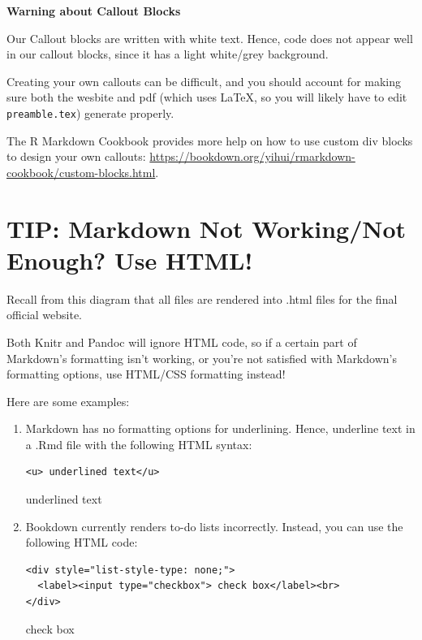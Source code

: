 \documentclass[
]{book}
\newenvironment{redbox}{
  \definecolor{shadecolor}{RGB}{243, 154, 157}
  \color{white}
  \begin{shaded}}
 {\end{shaded}}
\theoremstyle{definition}
\theoremstyle{definition}
\theoremstyle{definition}
\theoremstyle{definition}
\theoremstyle{remark}
\begin{document}
\begin{redbox}

\begin{center}
\textbf{Warning about Callout Blocks}

\end{center}

Our Callout blocks are written with white text. Hence, code does not appear well in our callout blocks, since it has a light white/grey background.

\end{redbox}

Creating your own callouts can be difficult, and you should account for making sure both the wesbite and pdf (which uses LaTeX, so you will likely have to edit \texttt{preamble.tex}) generate properly.

The R Markdown Cookbook provides more help on how to use custom div blocks to design your own callouts: \url{https://bookdown.org/yihui/rmarkdown-cookbook/custom-blocks.html}.

\section{TIP: Markdown Not Working/Not Enough? Use HTML!}\label{use-html}

Recall from this diagram that all files are rendered into .html files for the final official website.

Both Knitr and Pandoc will ignore HTML code, so if a certain part of Markdown's formatting isn't working, or you're not satisfied with Markdown's formatting options, use HTML/CSS formatting instead!

Here are some examples:

\begin{enumerate}
\def\labelenumi{\arabic{enumi}.}
\item
  Markdown has no formatting options for underlining. Hence, underline text in a .Rmd file with the following HTML syntax:

\begin{verbatim}
<u> underlined text</u>
\end{verbatim}

  underlined text
\item
  Bookdown currently renders to-do lists incorrectly. Instead, you can use the following HTML code:

\begin{verbatim}
<div style="list-style-type: none;">
  <label><input type="checkbox"> check box</label><br>
</div>
\end{verbatim}

  check box
\end{enumerate}
\end{document}
